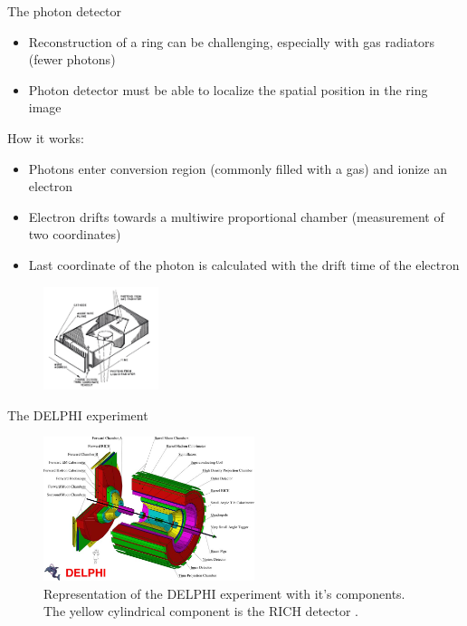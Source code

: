 \documentclass[aspectratio=1610, 10pt]{beamer}
\begin{document}
\begin{frame}{The photon detector}
  \begin{itemize}
    \item Reconstruction of a ring can be challenging, especially with gas radiators (fewer photons)
    \medskip
    \item Photon detector must be able to localize the spatial position in the ring image
  \end{itemize}
How it works:
\begin{itemize}
  \item Photons enter conversion region (commonly filled with a gas) and ionize an electron
  \medskip
  \item Electron drifts towards a multiwire proportional chamber (measurement of two coordinates)
  \medskip
  \item Last coordinate of the photon is calculated with the drift time of the electron
\end{itemize}
  \begin{figure}
    \includegraphics[width=0.3\textwidth]{images/photon_det.png}
  \end{figure}
\end{frame}

\begin{frame}{The DELPHI experiment}
  \begin{figure}
    \includegraphics[width=0.55\textwidth]{images/delphi.jpg}
    \caption{Representation of the DELPHI experiment with it's components. The yellow cylindrical component is the RICH detector \cite{delphi}.}
  \end{figure}
\end{frame}
\end{document}
